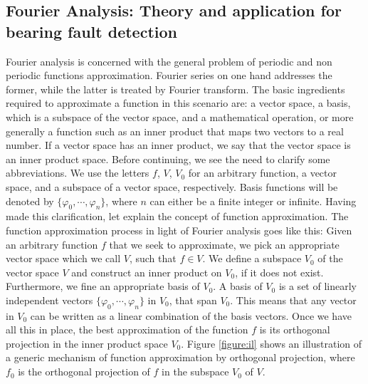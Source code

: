 \documentclass[11pt, oneside]{article}   	%
\begin{document}
\subsection{Fourier Analysis: Theory and application for bearing fault detection}
Fourier analysis is concerned with the general problem of periodic and non periodic functions approximation. Fourier series on one hand addresses the former, while the latter is treated by Fourier transform. The basic ingredients required to approximate a function in this scenario are: a vector space, a basis, which is a subspace of the vector space, and a mathematical operation, or more generally a function such as an inner product that maps two vectors to a real number. If a vector space has an inner product, we say that the vector space is an inner product space. 
\justify
Before continuing, we see the need to clarify some abbreviations. We use the letters $f$, $V$, $V_{0}$ for an arbitrary function, a vector space, and a subspace of a vector space, respectively.
Basis functions will be denoted by $\{  \varphi_{0}, \cdots,\varphi_{n}\}$, where $n$ can either be a finite integer or infinite. Having made this clarification, let explain the concept of function approximation. 
\justify
The function approximation process in light of Fourier analysis goes like this: Given an arbitrary function $f$ that we seek to approximate, we pick an appropriate vector space which we call $V$, such that $f\in V$. We define a subspace $V_{0}$ of the vector space $V$ and construct an inner product on $V_{0}$, if it does not exist. Furthermore, we fine an appropriate basis of $V_{0}$.  A basis of $V_{0}$ is a set of linearly independent vectors   $\{  \varphi_{0}, \cdots,\varphi_{n}\}$ in $V_{0}$, that span $V_{0}$. This means that any vector in $V_{0}$ can be written as a linear combination of the basis vectors. Once we have all this in place, the best approximation of the function $f$ is its orthogonal projection in the inner product space $V_{0}$. Figure \ref{figure:il} shows an illustration of a generic mechanism of function approximation by orthogonal projection, where $f_{0}$ is the orthogonal projection of $f$ in the subspace $V_{0}$ of $V$.
\justify
\end{document}
